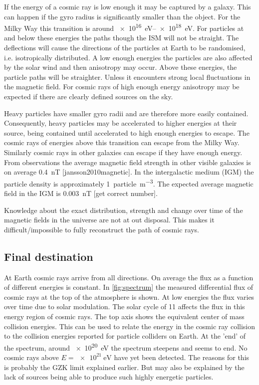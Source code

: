If the energy of a cosmic ray is low enough it may be captured by a galaxy. This can happen if the gyro radius is significantly smaller than the object. For the Milky Way this transition is around \SIrange{e16}{e18}{\eV}. For particles at and below these energies the paths though the ISM will not be straight. The deflections will cause the directions of the particles at Earth to be randomised, i.e. isotropically distributed. A low enough energies the particles are also affected by the solar wind and then anisotropy may occur. Above these energies, the particle paths will be straighter. Unless it encounters strong local fluctuations in the magnetic field. For cosmic rays of high enough energy anisotropy may be expected if there are clearly defined sources on the sky.

Heavy particles have smaller gyro radii and are therefore more easily contained. Consequently, heavy particles may be accelerated to higher energies at their source, being contained until accelerated to high enough energies to escape. The cosmic rays of energies above this transition can escape from the Milky Way. Similarly cosmic rays in other galaxies can escape if they have enough energy. From observations the average magnetic field strength in other visible galaxies is on average \SI{.4}{\nano\tesla} [jansson2010magnetic]. In the intergalactic medium (IGM) the particle density is approximately \SI{1}{particle\per\meter\cubed}. The expected average magnetic field in the IGM is \SI{.003}{\nano\tesla} [get correct number].

Knowledge about the exact distribution, strength and change over time of the magnetic fields in the universe are not at out disposal. This makes it difficult/impossible to fully reconstruct the path of cosmic rays.

\subsection{Final destination}

At Earth cosmic rays arrive from all directions. On average the flux as a function of different energies is constant. In \cref{fig:spectrum} the measured differential flux of cosmic rays at the top of the atmosphere is shown. At low energies the flux varies over time due to solar modulation. The solar cycle of \SI{11}{\year} affects the flux in this energy region of cosmic rays. The top axis shows the equivalent center of mass collision energies. This can be used to relate the energy in the cosmic ray collision to the collision energies reported for particle colliders on Earth. At the 'end' of the spectrum, around \SI{e20}{\eV} the spectrum steepens and seems to end. No cosmic rays above $E = \SI{e21}{\eV}$ have yet been detected. The reasons for this is probably the GZK limit explained earlier. But may also be explained by the lack of sources being able to produce such highly energetic particles.

